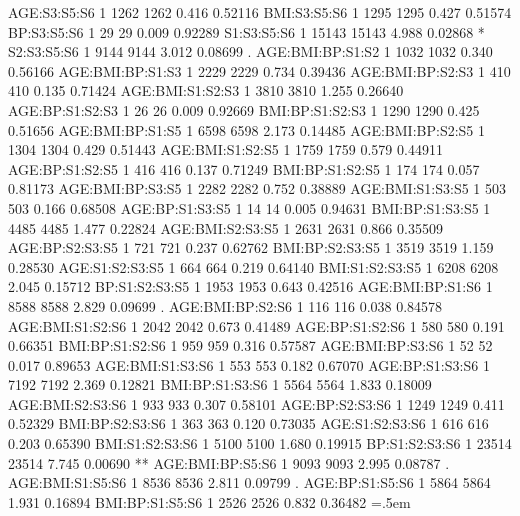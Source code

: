 \documentclass[runningheads]{llncs}
\newenvironment{lcverbatim}
 {\SaveVerbatim{cverb}}
 {\endSaveVerbatim
  \flushleft\fboxrule=0pt\fboxsep=.5em
  \colorbox{cverbbg}{%
    \makebox[\dimexpr\linewidth-2\fboxsep][l]{\BUseVerbatim{cverb}}%
  }
  \endflushleft
}
\begin{document}
\begin{lcverbatim}
AGE:S3:S5:S6            1   1262    1262   0.416  0.52116    
BMI:S3:S5:S6            1   1295    1295   0.427  0.51574    
BP:S3:S5:S6             1     29      29   0.009  0.92289    
S1:S3:S5:S6             1  15143   15143   4.988  0.02868 *  
S2:S3:S5:S6             1   9144    9144   3.012  0.08699 .  
AGE:BMI:BP:S1:S2        1   1032    1032   0.340  0.56166    
AGE:BMI:BP:S1:S3        1   2229    2229   0.734  0.39436    
AGE:BMI:BP:S2:S3        1    410     410   0.135  0.71424    
AGE:BMI:S1:S2:S3        1   3810    3810   1.255  0.26640    
AGE:BP:S1:S2:S3         1     26      26   0.009  0.92669    
BMI:BP:S1:S2:S3         1   1290    1290   0.425  0.51656    
AGE:BMI:BP:S1:S5        1   6598    6598   2.173  0.14485    
AGE:BMI:BP:S2:S5        1   1304    1304   0.429  0.51443    
AGE:BMI:S1:S2:S5        1   1759    1759   0.579  0.44911    
AGE:BP:S1:S2:S5         1    416     416   0.137  0.71249    
BMI:BP:S1:S2:S5         1    174     174   0.057  0.81173    
AGE:BMI:BP:S3:S5        1   2282    2282   0.752  0.38889    
AGE:BMI:S1:S3:S5        1    503     503   0.166  0.68508    
AGE:BP:S1:S3:S5         1     14      14   0.005  0.94631    
BMI:BP:S1:S3:S5         1   4485    4485   1.477  0.22824    
AGE:BMI:S2:S3:S5        1   2631    2631   0.866  0.35509    
AGE:BP:S2:S3:S5         1    721     721   0.237  0.62762    
BMI:BP:S2:S3:S5         1   3519    3519   1.159  0.28530    
AGE:S1:S2:S3:S5         1    664     664   0.219  0.64140    
BMI:S1:S2:S3:S5         1   6208    6208   2.045  0.15712    
BP:S1:S2:S3:S5          1   1953    1953   0.643  0.42516    
AGE:BMI:BP:S1:S6        1   8588    8588   2.829  0.09699 .  
AGE:BMI:BP:S2:S6        1    116     116   0.038  0.84578    
AGE:BMI:S1:S2:S6        1   2042    2042   0.673  0.41489    
AGE:BP:S1:S2:S6         1    580     580   0.191  0.66351    
BMI:BP:S1:S2:S6         1    959     959   0.316  0.57587    
AGE:BMI:BP:S3:S6        1     52      52   0.017  0.89653    
AGE:BMI:S1:S3:S6        1    553     553   0.182  0.67070    
AGE:BP:S1:S3:S6         1   7192    7192   2.369  0.12821    
BMI:BP:S1:S3:S6         1   5564    5564   1.833  0.18009    
AGE:BMI:S2:S3:S6        1    933     933   0.307  0.58101    
AGE:BP:S2:S3:S6         1   1249    1249   0.411  0.52329    
BMI:BP:S2:S3:S6         1    363     363   0.120  0.73035    
AGE:S1:S2:S3:S6         1    616     616   0.203  0.65390    
BMI:S1:S2:S3:S6         1   5100    5100   1.680  0.19915    
BP:S1:S2:S3:S6          1  23514   23514   7.745  0.00690 ** 
AGE:BMI:BP:S5:S6        1   9093    9093   2.995  0.08787 .  
AGE:BMI:S1:S5:S6        1   8536    8536   2.811  0.09799 .  
AGE:BP:S1:S5:S6         1   5864    5864   1.931  0.16894    
BMI:BP:S1:S5:S6         1   2526    2526   0.832  0.36482    
\end{lcverbatim}
\end{document}
